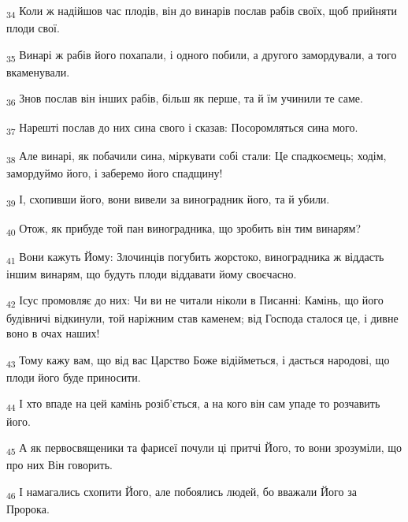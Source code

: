 \begin{tcolorbox}
\textsubscript{34} Коли ж надійшов час плодів, він до винарів послав рабів своїх, щоб прийняти плоди свої.
\end{tcolorbox}
\begin{tcolorbox}
\textsubscript{35} Винарі ж рабів його похапали, і одного побили, а другого замордували, а того вкаменували.
\end{tcolorbox}
\begin{tcolorbox}
\textsubscript{36} Знов послав він інших рабів, більш як перше, та й їм учинили те саме.
\end{tcolorbox}
\begin{tcolorbox}
\textsubscript{37} Нарешті послав до них сина свого і сказав: Посоромляться сина мого.
\end{tcolorbox}
\begin{tcolorbox}
\textsubscript{38} Але винарі, як побачили сина, міркувати собі стали: Це спадкоємець; ходім, замордуймо його, і заберемо його спадщину!
\end{tcolorbox}
\begin{tcolorbox}
\textsubscript{39} І, схопивши його, вони вивели за виноградник його, та й убили.
\end{tcolorbox}
\begin{tcolorbox}
\textsubscript{40} Отож, як прибуде той пан виноградника, що зробить він тим винарям?
\end{tcolorbox}
\begin{tcolorbox}
\textsubscript{41} Вони кажуть Йому: Злочинців погубить жорстоко, виноградника ж віддасть іншим винарям, що будуть плоди віддавати йому своєчасно.
\end{tcolorbox}
\begin{tcolorbox}
\textsubscript{42} Ісус промовляє до них: Чи ви не читали ніколи в Писанні: Камінь, що його будівничі відкинули, той наріжним став каменем; від Господа сталося це, і дивне воно в очах наших!
\end{tcolorbox}
\begin{tcolorbox}
\textsubscript{43} Тому кажу вам, що від вас Царство Боже відійметься, і дасться народові, що плоди його буде приносити.
\end{tcolorbox}
\begin{tcolorbox}
\textsubscript{44} І хто впаде на цей камінь розіб'ється, а на кого він сам упаде то розчавить його.
\end{tcolorbox}
\begin{tcolorbox}
\textsubscript{45} А як первосвященики та фарисеї почули ці притчі Його, то вони зрозуміли, що про них Він говорить.
\end{tcolorbox}
\begin{tcolorbox}
\textsubscript{46} І намагались схопити Його, але побоялись людей, бо вважали Його за Пророка.
\end{tcolorbox}
